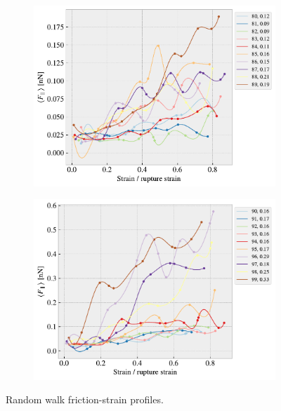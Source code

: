 \begin{figure}[H]
\begin{subfigure}[b]{0.49\textwidth}
        \centering
        \includegraphics[width=\textwidth]{figures/stretch_profiles/RW/SP_8_RW.pdf}
        \caption{}
    \end{subfigure}
    \hfill
    \begin{subfigure}[b]{0.49\textwidth}
        \centering
        \includegraphics[width=\textwidth]{figures/stretch_profiles/RW/SP_9_RW.pdf}
        \caption{}
    \end{subfigure}
    \hfill
    \caption{Random walk friction-strain profiles.}\label{fig:fric_strain_RW}
\end{figure}
